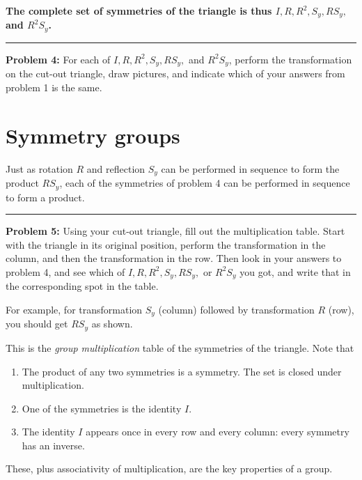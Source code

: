 \documentclass[letter]{article}
\newcommand{\Sy}{S_y}
\begin{document}
\vspace{4mm}
{\bf The complete set of symmetries of the triangle is thus $I, R, R^2, \Sy, R\Sy,$ and $R^2\Sy$.}

\vspace{4mm}
\rule{\textwidth}{0.5pt}
{\bf Problem 4:} For each of $I, R, R^2, \Sy, R\Sy,$ and $R^2\Sy$, perform the transformation on
the cut-out triangle, draw pictures, and indicate which of your answers from problem 1 is the same. 


\pagebreak

\section{Symmetry groups}

Just as rotation $R$ and reflection $\Sy$ can be performed in sequence to form the product $R \Sy$,
each of the symmetries of problem 4 can be performed in sequence to form a product.

\vspace{2mm}
\rule{\textwidth}{0.5pt}
{\bf Problem 5:} Using your cut-out triangle, fill out the multiplication table. Start with the triangle
in its original position, perform the transformation in the column, and then the transformation
in the row. Then look in your answers to problem 4, and see which of $I, R, R^2, \Sy, R\Sy,$ or
$R^2\Sy$ you got, and write that in the corresponding spot in the table.

\vspace{2mm}
For example, for transformation $\Sy$ (column) followed by transformation $R$ (row), you should
get $R \Sy$ as shown. 




\vspace{130mm}
This is the {\em group multiplication} table of the symmetries of the triangle. Note that
\begin{enumerate}
\item The product of any two symmetries is a symmetry. The set is closed under multiplication.
  \vspace{-2mm}
\item One of the symmetries is the identity $I$. 
  \vspace{-2mm}
\item The identity $I$ appears once in every row and every column: every symmetry has an inverse.
\end{enumerate}  
These, plus associativity of multiplication, are the key properties of a group.
\end{document}
